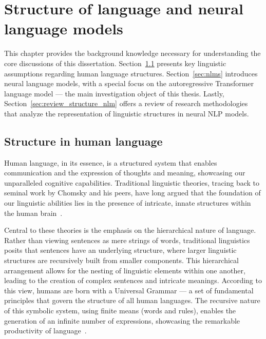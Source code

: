 \chapter{Structure of language and neural language models}\label{chp:background}


\startcontents[chapters]
\printmyminitoc{
}

This chapter provides the background knowledge necessary for understanding the core discussions of this dissertation. Section~\ref{sec:struc_lang} presents key linguistic assumptions regarding human language structures. Section~\ref{sec:nlms} introduces neural language models, with a special focus on the autoregressive Transformer language model --- the main investigation object of this thesis. Lastly, Section~\ref{sec:review_structure_nlm} offers a review of research methodologies that analyze the representation of linguistic structures in neural NLP models.

\section{Structure in human language} \label{sec:struc_lang}

Human language, in its essence, is a structured system that enables communication and the expression of thoughts and meaning, showcasing our unparalleled cognitive capabilities. Traditional linguistic theories, tracing back to seminal work by Chomsky and his peers, have long argued that the foundation of our linguistic abilities lies in the presence of intricate, innate structures within the human brain~\citep{chomsky1965aspects,chomsky1986knowledge}. 

Central to these theories is the emphasis on the hierarchical nature of language. Rather than viewing sentences as mere strings of words, traditional linguistics posits that sentences have an underlying structure, where larger linguistic structures are recursively built from smaller components. This hierarchical arrangement allows for the nesting of linguistic elements within one another, leading to the creation of complex sentences and intricate meanings. According to this view, humans are born with a Universal Grammar --- a set of fundamental principles that govern the structure of all human languages. The recursive nature of this symbolic system, using finite means (words and rules), enables the generation of an infinite number of expressions, showcasing the remarkable productivity of language~\citep{chomsky1965aspects, hauser2002faculty}.

